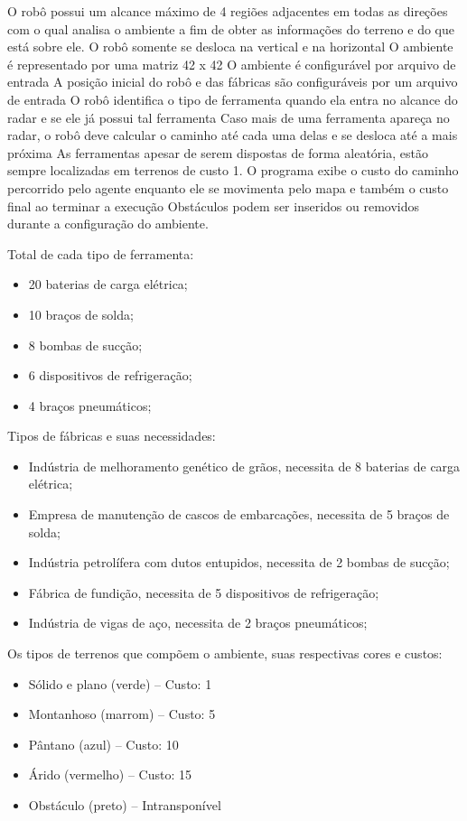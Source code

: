 \documentclass[12pt]{article}
\begin{document}
%
O robô possui um alcance máximo de 4 regiões adjacentes em todas as direções com o qual analisa o ambiente a fim de obter as informações do terreno e do que está sobre ele.
%
O robô somente se desloca na vertical e na horizontal
%
O ambiente é representado por uma matriz 42 x 42
%
O ambiente é configurável por arquivo de entrada
%
A posição inicial do robô e das fábricas são configuráveis por um arquivo de entrada
%
O robô identifica o tipo de ferramenta quando ela entra no alcance do radar e se ele já possui tal ferramenta
Caso mais de uma ferramenta apareça no radar, o robô deve calcular o caminho até cada uma delas e se desloca até a mais próxima
%
As ferramentas apesar de serem dispostas de forma aleatória, estão sempre localizadas em terrenos de custo 1. 
%
O programa exibe o custo do caminho percorrido pelo agente enquanto ele se movimenta pelo mapa e também o custo final ao terminar a execução
%
Obstáculos podem ser inseridos ou removidos durante a configuração do ambiente.

Total de cada tipo de ferramenta:
\begin{itemize}
	\item 20 baterias de carga elétrica;
	\item 10 braços de solda;
	\item 8 bombas de sucção;
	\item 6 dispositivos de refrigeração;
	\item 4 braços pneumáticos;
\end{itemize}

Tipos de fábricas e suas necessidades:
\begin{itemize}
	\item Indústria de melhoramento genético de grãos, necessita de 8 baterias de carga elétrica;
	\item Empresa de manutenção de cascos de embarcações, necessita de 5 braços de solda;
	\item Indústria petrolífera com dutos entupidos, necessita de 2 bombas de sucção;
	\item Fábrica de fundição, necessita de 5 dispositivos de refrigeração;
	\item Indústria de vigas de aço, necessita de 2 braços pneumáticos;
\end{itemize}

Os tipos de terrenos que compõem o ambiente, suas respectivas cores e custos:
\begin{itemize}
	\item Sólido e plano (verde) – Custo: 1
	\item Montanhoso (marrom) – Custo: 5
	\item Pântano (azul) – Custo: 10
	\item Árido (vermelho) – Custo: 15
	\item Obstáculo (preto) – Intransponível
\end{itemize}
\end{document}
